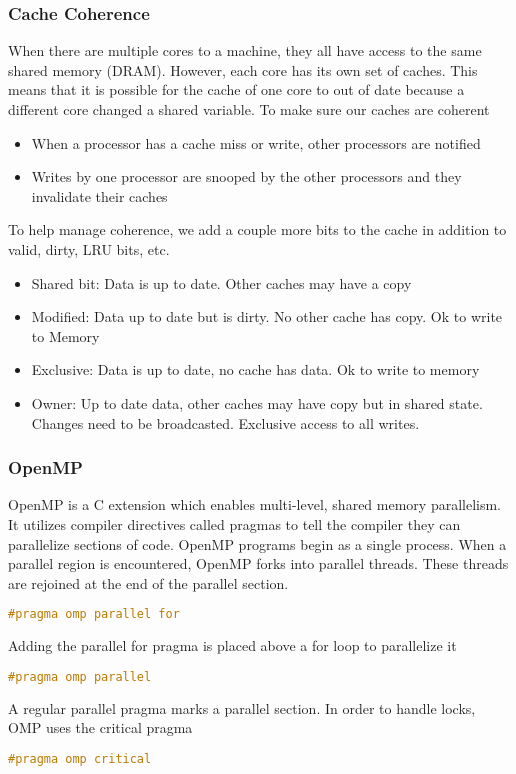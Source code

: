 \documentclass{article}
\begin{document}
\subsubsection{Cache Coherence}
When there are multiple cores to a machine, they all have access to the same shared memory (DRAM). However, each core has its own set of caches. This means that it is possible
for the cache of one core to out of date because a different core changed a shared variable. To make sure our caches are coherent
\begin{itemize}
    \item When a processor has a cache miss or write, other processors are notified
    \item Writes by one processor are snooped by the other processors and they invalidate their caches
\end{itemize}
To help manage coherence, we add a couple more bits to the cache in addition to valid, dirty, LRU bits, etc.
\begin{itemize}
    \item Shared bit: Data is up to date. Other caches may have a copy
    \item Modified: Data up to date but is dirty. No other cache has copy. Ok to write to Memory
    \item Exclusive: Data is up to date, no cache has data. Ok to write to memory
    \item Owner: Up to date data, other caches may have copy but in shared state. Changes need to be broadcasted. Exclusive access to all writes.
\end{itemize}
\subsubsection{OpenMP}
OpenMP is a C extension which enables multi-level, shared memory parallelism. It utilizes compiler directives called pragmas to tell the compiler they can parallelize sections of code.
OpenMP programs begin as a single process. When a parallel region is encountered, OpenMP forks into parallel threads. These threads are rejoined at the end of the parallel section.
\begin{lstlisting}[language=C]
    #pragma omp parallel for
\end{lstlisting}
Adding the parallel for pragma is placed above a for loop to parallelize it
\begin{lstlisting}[language=C]
    #pragma omp parallel
\end{lstlisting}
A regular parallel pragma marks a parallel section.
In order to handle locks, OMP uses the critical pragma
\begin{lstlisting}[language=C]
    #pragma omp critical
\end{lstlisting}
\end{document}
